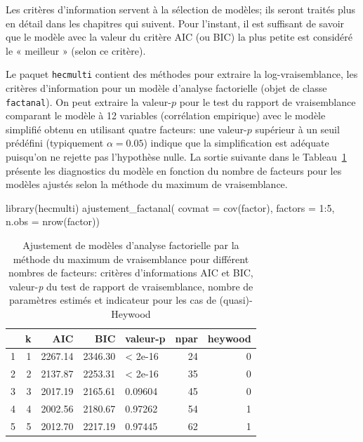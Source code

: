 \documentclass[
  11pt,
  letterpaper,
]{scrbook}
\newenvironment{Shaded}{\begin{snugshade}}{\end{snugshade}}
\newcommand{\AttributeTok}[1]{\textcolor[rgb]{0.40,0.45,0.13}{#1}}
\newcommand{\DecValTok}[1]{\textcolor[rgb]{0.68,0.00,0.00}{#1}}
\newcommand{\FunctionTok}[1]{\textcolor[rgb]{0.28,0.35,0.67}{#1}}
\newcommand{\NormalTok}[1]{\textcolor[rgb]{0.00,0.23,0.31}{#1}}
\newcommand{\SpecialCharTok}[1]{\textcolor[rgb]{0.37,0.37,0.37}{#1}}
\theoremstyle{definition}
\theoremstyle{remark}
\begin{document}
Les critères d'information servent à la sélection de modèles; ils seront
traités plus en détail dans les chapitres qui suivent. Pour l'instant,
il est suffisant de savoir que le modèle avec la valeur du critère AIC
(ou BIC) la plus petite est considéré le « meilleur » (selon ce
critère).

Le paquet \texttt{hecmulti} contient des méthodes pour extraire la
log-vraisemblance, les critères d'information pour un modèle d'analyse
factorielle (objet de classe \texttt{factanal}). On peut extraire la
valeur-\(p\) pour le test du rapport de vraisemblance comparant le
modèle à 12 variables (corrélation empirique) avec le modèle simplifié
obtenu en utilisant quatre facteurs: une valeur-\(p\) supérieur à un
seuil prédéfini (typiquement \(\alpha=0.05\)) indique que la
simplification est adéquate puisqu'on ne rejette pas l'hypothèse nulle.
La sortie suivante dans le Tableau~\ref{tbl-emvcrit} présente les
diagnostics du modèle en fonction du nombre de facteurs pour les modèles
ajustés selon la méthode du maximum de vraisemblance.

\begin{Shaded}
\begin{Highlighting}[]
\FunctionTok{library}\NormalTok{(hecmulti)}
\FunctionTok{ajustement\_factanal}\NormalTok{(}
    \AttributeTok{covmat =} \FunctionTok{cov}\NormalTok{(factor),}
    \AttributeTok{factors =} \DecValTok{1}\SpecialCharTok{:}\DecValTok{5}\NormalTok{,}
    \AttributeTok{n.obs =} \FunctionTok{nrow}\NormalTok{(factor))}
\end{Highlighting}
\end{Shaded}

\hypertarget{tbl-emvcrit}{}
\begin{table}
\caption{\label{tbl-emvcrit}Ajustement de modèles d'analyse factorielle par la méthode du maximum de
vraisemblance pour différent nombres de facteurs: critères
d'informations AIC et BIC, valeur-\emph{p} du test de rapport de
vraisemblance, nombre de paramètres estimés et indicateur pour les cas
de (quasi)-Heywood }\tabularnewline

\centering
\begin{tabular}{lrrrlrr}
\toprule
  & k & AIC & BIC & valeur-p & npar & heywood\\
\midrule
1 & 1 & 2267.14 & 2346.30 & < 2e-16 & 24 & 0\\
2 & 2 & 2137.87 & 2253.31 & < 2e-16 & 35 & 0\\
3 & 3 & 2017.19 & 2165.61 & 0.09604 & 45 & 0\\
4 & 4 & 2002.56 & 2180.67 & 0.97262 & 54 & 1\\
5 & 5 & 2012.70 & 2217.19 & 0.97445 & 62 & 1\\
\bottomrule
\end{tabular}
\end{table}
\end{document}
